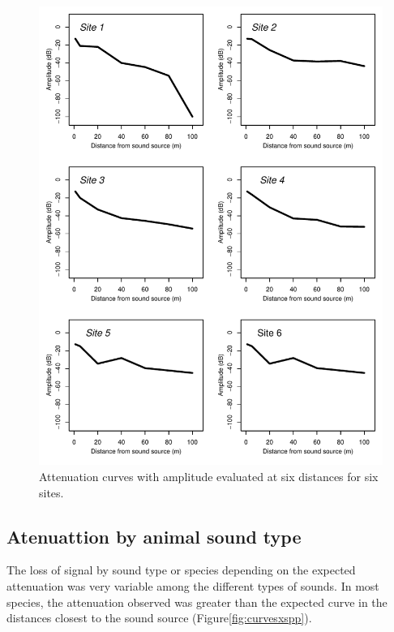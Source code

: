 \documentclass[fleqn,10pt,lineno]{wlpeerj} %
\begin{document}
\begin{figure}

{\centering \includegraphics[width=1\linewidth]{ASR_MyPaper_2020_files/figure-latex/curvesxsite-1} 

}

\caption{Attenuation curves with amplitude evaluated at six distances for six sites.\label{fig:curvesxsite}}\label{fig:curvesxsite}
\end{figure}

\hypertarget{atenuattion-by-animal-sound-type}{%
\subsection*{Atenuattion by animal sound
type}\label{atenuattion-by-animal-sound-type}}

The loss of signal by sound type or species depending on the expected
attenuation was very variable among the different types of sounds. In
most species, the attenuation observed was greater than the expected
curve in the distances closest to the sound source
(Figure\ref{fig:curvesxspp}).
\end{document}
